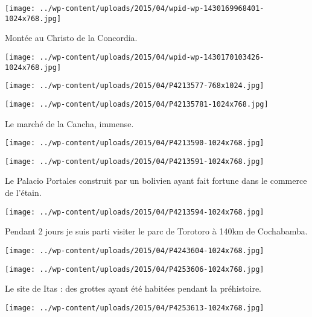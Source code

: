  \newline
 \newline
\centerline{\texttt{[image: ../wp-content/uploads/2015/04/wpid-wp-1430169968401-1024x768.jpg]} } 
 \newline
 Montée au Christo de la Concordia. \newline
 \newline
\centerline{\texttt{[image: ../wp-content/uploads/2015/04/wpid-wp-1430170103426-1024x768.jpg]} } 
 \newline
 \newline
\centerline{\texttt{[image: ../wp-content/uploads/2015/04/P4213577-768x1024.jpg]} } 
 \newline
 \newline
\centerline{\texttt{[image: ../wp-content/uploads/2015/04/P42135781-1024x768.jpg]} } 
 \newline
 Le marché de la Cancha, immense. \newline
 \newline
\centerline{\texttt{[image: ../wp-content/uploads/2015/04/P4213590-1024x768.jpg]} } 
 \newline
 \newline
\centerline{\texttt{[image: ../wp-content/uploads/2015/04/P4213591-1024x768.jpg]} } 
 \newline
 Le Palacio Portales construit par un bolivien ayant fait fortune dans le commerce de l'étain. \newline
 \newline
\centerline{\texttt{[image: ../wp-content/uploads/2015/04/P4213594-1024x768.jpg]} } 
 \newline
 Pendant 2 jours je suis parti visiter le parc de Torotoro à 140km de Cochabamba. \newline
 \newline
\centerline{\texttt{[image: ../wp-content/uploads/2015/04/P4243604-1024x768.jpg]} } 
 \newline
 \newline
\centerline{\texttt{[image: ../wp-content/uploads/2015/04/P4253606-1024x768.jpg]} } 
 \newline
 Le site de Itas : des grottes ayant été habitées pendant la préhistoire. \newline
 \newline
\centerline{\texttt{[image: ../wp-content/uploads/2015/04/P4253613-1024x768.jpg]} } 
 \newline
